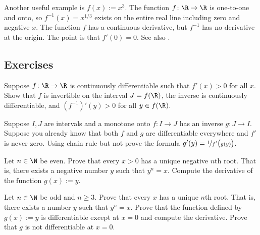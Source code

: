 \documentclass[12pt]{book}
\begin{document}
\begin{example}
Another useful example is $f(x) := x^3$.
The function $f \colon \R \to \R$ is
one-to-one and onto, so $f^{-1}(x) = x^{1/3}$ exists on the entire real
line including zero and negative $x$.
The function $f$ has
a continuous derivative, but $f^{-1}$ has no derivative at the origin.
The
point is that $f'(0) = 0$.
See also .
\end{example}


\subsection*{Exercises}

\begin{exercise}
Suppose $f \colon \R \to \R$ is continuously differentiable such that
$f'(x) > 0$ for all $x$.
Show that $f$ is invertible on the interval $J =
f(\R)$, the inverse is continuously differentiable, and ${(f^{-1})}'(y) >
0$ for all $y \in f(\R)$.
\end{exercise}


\begin{exercise}
Suppose $I,J$ are intervals and a monotone onto $f \colon I \to J$ has an inverse $g \colon J \to I$.
Suppose you already know that both $f$ and $g$ are differentiable
everywhere and $f'$ is never zero.
Using chain rule but not  prove the
formula $g'(y) = \nicefrac{1}{f'\bigl(g(y)\bigr)}$.
\end{exercise}

\begin{exercise}
Let $n\in \N$ be even.
Prove that every $x > 0$ has a unique negative $n$th root.
That is, there exists a negative number $y$ such that $y^n = x$.
Compute the derivative
of the function $g(x) := y$.
\end{exercise}

\begin{exercise} \label{exercise:oddroot}
Let $n \in \N$ be odd and $n \geq 3$.
Prove that every $x$ has a unique $n$th root.
That is, there exists a number $y$ such that $y^n = x$.
Prove that
the function defined by $g(x) := y$ is differentiable except at $x=0$
and compute the derivative.
Prove that $g$ is not differentiable at $x=0$.
\end{exercise}
\end{document}
